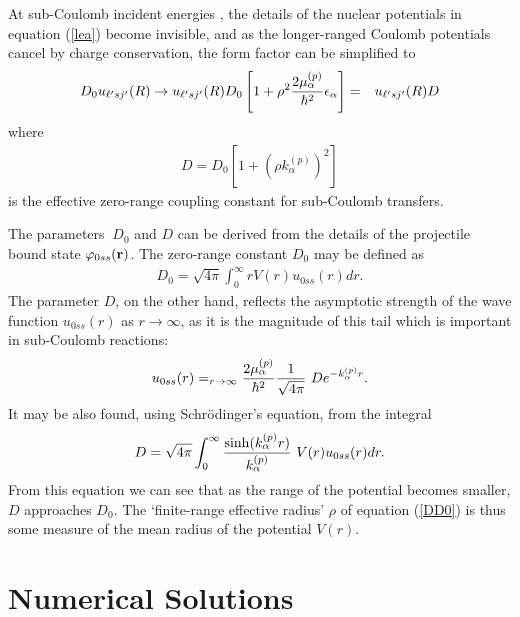 \documentclass[11pt,a4paper]{article}
\newcommand{\vecr}{{\bf r}}
\begin{document}
At sub-Coulomb incident energies \cite{gold68}, the details of the nuclear potentials
in equation (\ref{lea}) become invisible, and as the longer-ranged Coulomb
potentials cancel by charge conservation, the form factor can be simplified to
\begin{eqnarray}
 D_0 u_{\ell' sj'} (R) \rightarrow
     u_{\ell' sj'} (R) D_0
       \left [ 1 + \rho^2 {2 \mu _\alpha^{(p)}\over \hbar^2} \epsilon _\alpha \right ]
   &=& u_{\ell' sj'} (R) D
\end{eqnarray}
where
\begin{eqnarray} \label{DD0}
  D = D_0 \left [ 1 + \left ( \rho k _\alpha^{(p)} \right ) ^2 \right ]
\end{eqnarray}
is the effective zero-range coupling constant for sub-Coulomb transfers.

The parameters $~ D_0 $ and $ D $ can be derived
from the details of the projectile bound state $ \varphi_{0ss} ( \vecr)$.
The zero-range constant $ D_0$ may be defined as
\begin{eqnarray}
    D_0 = \sqrt {4 \pi} \int_ 0^\infty r V(r) u_{0ss} (r) dr.
\end{eqnarray}
The parameter $D$, on the other hand, reflects the asymptotic
strength of the wave function $u_{0ss} (r)$ as $r \rightarrow \infty$,
as it is the magnitude of this tail which is important in sub-Coulomb reactions:
\begin{eqnarray}
    u_{0ss} (r) = _ {r \rightarrow \infty}
         {2 \mu _\alpha^{(p)}\over \hbar^2} {1 \over \sqrt {4 \pi}} ~
         D e^{-k _\alpha^{(p)} r} .
\end{eqnarray}
It may be also found, using Schr\"odinger's equation, from the
integral
\begin{eqnarray}
    D  = \sqrt {4 \pi} \int_ 0 ^\infty
                {\sinh (k^{(p)} _\alpha r)\over k^{(p)} _\alpha} ~
                  V(r) u_{0ss} (r) dr.
\end{eqnarray}
From this equation we can see that as the range of the potential becomes smaller,
$D$ approaches $D_0$. The `finite-range effective radius'
$\rho$ of equation (\ref{DD0}) is thus some measure of the mean radius
of the potential $V(r).$
\section{Numerical Solutions}
\label{solns}
\end{document}
